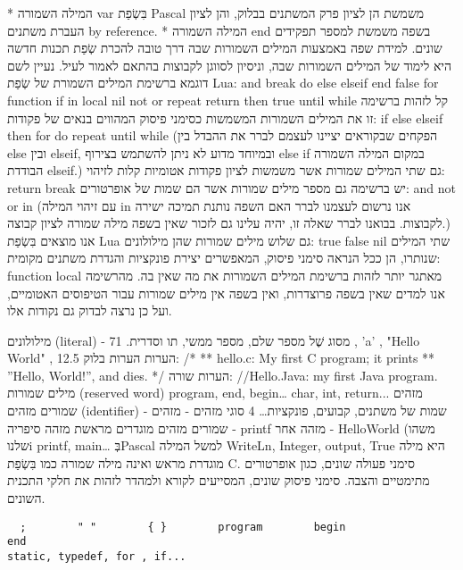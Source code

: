       * המילה השמורה var בִּשְׂפַת   Pascal משמשת הן לציון פרק המשתנים בבלוק, והן לציון העברת משתנים by reference.
      * המילה השמורה end בשפה משמשת למספר תפקידים שונים.
      למידת שפה באמצעות המילים השמורות שבה
      דרך טובה להכרת שְׂפַת תכנות חדשה היא לימוד של המילים השמורות שבה, וניסיון לסווגן לקבוצות בהתאם לאמור לעיל. נעיין לשם דוגמא ברשימת המילים השמורת של שְׂפַת Lua:
      and break do else elseif end false for function if in local nil not or repeat return then true until while
      קל לזהות ברשימה זו את המילים השמורות המשמשות כסימני פיסוק המהווים בנאים של פקודות:
      if else elseif then for do repeat until while
      (הפקחים שבקוראים יציינו לעצמם לברר את ההבדל בין else ובין elseif, ובמיוחד מדוע לא ניתן להשתמש בצירוף else if במקום המילה השמורה הבודדת elseif.)
      גם שתי המילים שמורות אשר משמשות לציון פקודות אטומיות  קלות לזיהוי:
      return break
      יש ברשימה גם מספר מילים שמורות אשר הם שמות של אופרטורים:
      and not or in
      (עם זיהוי המילה in אנו נרשום לעצמנו לברר האם השפה נותנת תמיכה ישירה לקבוצות. בבואנו לברר שאלה זו, יהיה עלינו גם לזכור שאין בשפה מילה שמורה לציון קבוצה.)
      אנו מוצאים בִּשְׂפַת  Lua גם שלוש מילים שמורות שהן מילולונים:
      true false nil
      שתי המילים שנותרו, הן ככל הנראה סימני פיסוק, המאפשרים יצירת פונקציות והגדרת משתנים מקומית:
      function local
      מאתגר יותר לזהות ברשימת המילים השמורות את מה שאין בה. מהרשימה אנו למדים שאין בשפה פרוצדרות, ואין  בשפה אין מילים שמורות עבור הטיפוסים האטומיים, ועל כן נרצה לבדוק גם נקודות אלו.

      מילולונים (literal) - מסוג שֶׁל מספר שלם, מספר ממשי, תו וסדרית.
      71 , 'a' , "Hello World" , 12.5
      הערות
      הערות בלוק:
      /*
      ** hello.c: My first C program; it prints
      ** ”Hello, World!”, and dies.
      */
      הערות שורה:
      //Hello.Java: my first Java program.
      מילים שמורות (reserved word)
      program, end, begin…
      char, int, return...        מזהים שמורים
      מזהים (identifier) - שמות של משתנים, קבועים, פונקציות…
      4 סוגי מזהים -
      מזהים שמורים
      מזהים מוגדרים מראשת
      מזהה סיפריה - printf
      מזהה אחר - HelloWorld (משהו שלנו^^)
      printf, main…
      בְּPascal למשל המילה WriteLn, Integer, output, True
      היא מילה מוגדרת מראש ואינה מילה שמורה כמו בִּשְׂפַת C.
      סימני פעולה שונים, כגון אופרטורים מתימטיים והצבה.
      סימני פיסוק שונים, המסייעים לקורא ולמהדר לזהות את חלקי התכנית השונים.
      \begin{verbatim}
  ;        " "        { }        program        begin                end
static, typedef, for , if...
      \end{verbatim}

